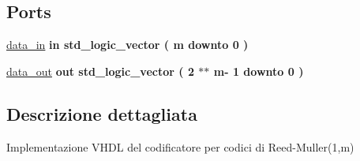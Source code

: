 \subsection*{Ports}
 \begin{DoxyCompactItemize}
\item 
\hypertarget{class_r_m_encoder_ga6c4b211b609ac114e830f481bf50560d}{\hyperlink{group___r_m_encoder_ga6c4b211b609ac114e830f481bf50560d}{data\+\_\+in}  {\bfseries {\bfseries \textcolor{keywordflow}{in}\textcolor{vhdlchar}{ }}} {\bfseries \textcolor{comment}{std\+\_\+logic\+\_\+vector}\textcolor{vhdlchar}{ }\textcolor{vhdlchar}{(}\textcolor{vhdlchar}{ }\textcolor{vhdlchar}{ }\textcolor{vhdlchar}{ }\textcolor{vhdlchar}{ }\textcolor{vhdlchar}{m}\textcolor{vhdlchar}{ }\textcolor{keywordflow}{downto}\textcolor{vhdlchar}{ }\textcolor{vhdlchar}{ } \textcolor{vhdldigit}{0} \textcolor{vhdlchar}{ }\textcolor{vhdlchar}{)}\textcolor{vhdlchar}{ }} }\label{class_r_m_encoder_ga6c4b211b609ac114e830f481bf50560d}

\item 
\hypertarget{class_r_m_encoder_ga33dd9cb04892f2d2a9352b65d17d4e1c}{\hyperlink{group___r_m_encoder_ga33dd9cb04892f2d2a9352b65d17d4e1c}{data\+\_\+out}  {\bfseries {\bfseries \textcolor{keywordflow}{out}\textcolor{vhdlchar}{ }}} {\bfseries \textcolor{comment}{std\+\_\+logic\+\_\+vector}\textcolor{vhdlchar}{ }\textcolor{vhdlchar}{(}\textcolor{vhdlchar}{ }\textcolor{vhdlchar}{ } \textcolor{vhdldigit}{2} \textcolor{vhdlchar}{$\ast$}\textcolor{vhdlchar}{$\ast$}\textcolor{vhdlchar}{ }\textcolor{vhdlchar}{ }\textcolor{vhdlchar}{ }\textcolor{vhdlchar}{m}\textcolor{vhdlchar}{-\/}\textcolor{vhdlchar}{ } \textcolor{vhdldigit}{1} \textcolor{vhdlchar}{ }\textcolor{keywordflow}{downto}\textcolor{vhdlchar}{ }\textcolor{vhdlchar}{ } \textcolor{vhdldigit}{0} \textcolor{vhdlchar}{ }\textcolor{vhdlchar}{)}\textcolor{vhdlchar}{ }} }\label{class_r_m_encoder_ga33dd9cb04892f2d2a9352b65d17d4e1c}

\end{DoxyCompactItemize}


\subsection{Descrizione dettagliata}
Implementazione V\+H\+D\+L del codificatore per codici di Reed-\/\+Muller(1,m) 

